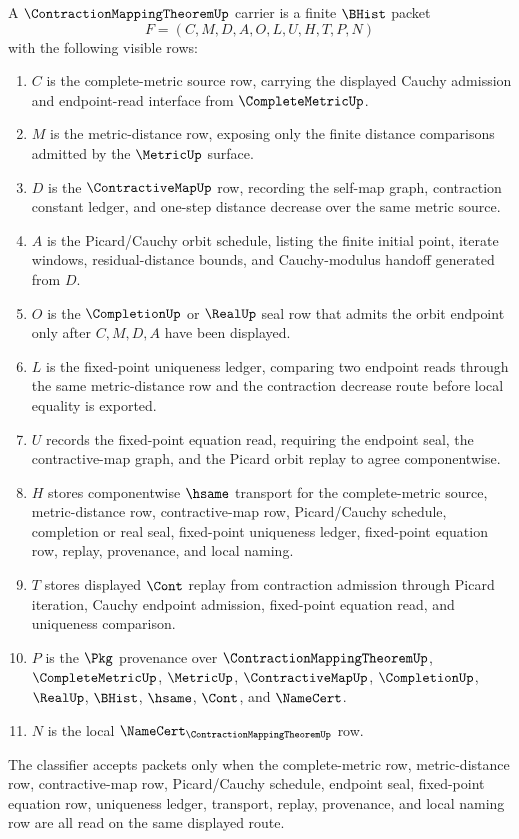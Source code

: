 \begin{definition}
\label{def:contraction-mapping-theorem-carrier}
A $\ContractionMappingTheoremUp$ carrier is a finite $\BHist$ packet
$$
F=(C,M,D,A,O,L,U,H,T,P,N)
$$
with the following visible rows:
\begin{enumerate}
\item $C$ is the complete-metric source row, carrying the displayed Cauchy admission and endpoint-read interface from $\CompleteMetricUp$.
\item $M$ is the metric-distance row, exposing only the finite distance comparisons admitted by the $\MetricUp$ surface.
\item $D$ is the $\ContractiveMapUp$ row, recording the self-map graph, contraction constant ledger, and one-step distance decrease over the same metric source.
\item $A$ is the Picard/Cauchy orbit schedule, listing the finite initial point, iterate windows, residual-distance bounds, and Cauchy-modulus handoff generated from $D$.
\item $O$ is the $\CompletionUp$ or $\RealUp$ seal row that admits the orbit endpoint only after $C,M,D,A$ have been displayed.
\item $L$ is the fixed-point uniqueness ledger, comparing two endpoint reads through the same metric-distance row and the contraction decrease route before local equality is exported.
\item $U$ records the fixed-point equation read, requiring the endpoint seal, the contractive-map graph, and the Picard orbit replay to agree componentwise.
\item $H$ stores componentwise $\hsame$ transport for the complete-metric source, metric-distance row, contractive-map row, Picard/Cauchy schedule, completion or real seal, fixed-point uniqueness ledger, fixed-point equation row, replay, provenance, and local naming.
\item $T$ stores displayed $\Cont$ replay from contraction admission through Picard iteration, Cauchy endpoint admission, fixed-point equation read, and uniqueness comparison.
\item $P$ is the $\Pkg$ provenance over $\ContractionMappingTheoremUp$, $\CompleteMetricUp$, $\MetricUp$, $\ContractiveMapUp$, $\CompletionUp$, $\RealUp$, $\BHist$, $\hsame$, $\Cont$, and $\NameCert$.
\item $N$ is the local $\NameCert_{\ContractionMappingTheoremUp}$ row.
\end{enumerate}
The classifier accepts packets only when the complete-metric row, metric-distance row, contractive-map row, Picard/Cauchy schedule, endpoint seal, fixed-point equation row, uniqueness ledger, transport, replay, provenance, and local naming row are all read on the same displayed route.
\end{definition}

